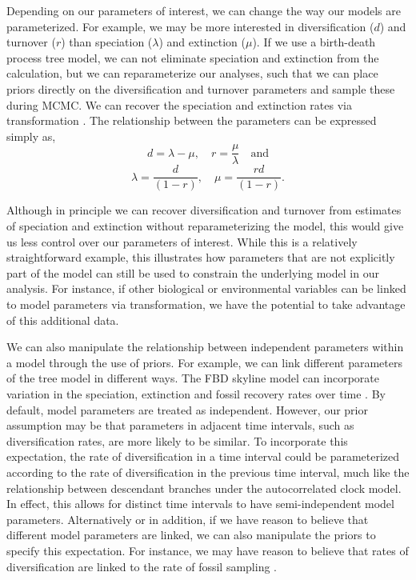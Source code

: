 Depending on our parameters of interest, we can change the way our models are parameterized.
For example, we may be more interested in diversification ($d$) and turnover ($r$) than speciation ($\lambda$) and extinction ($\mu$).
If we use a birth-death process tree model, we can not eliminate speciation and extinction from the calculation, but we can reparameterize our analyses, such that we can place priors directly on the diversification and turnover parameters and sample these during MCMC. We can recover the speciation and extinction rates via transformation \citep{Heath2014}.
The relationship between the parameters can be expressed simply as, 
$$d = \lambda - \mu, \quad r = \frac{\mu}{\lambda} \quad \textrm{and} $$ 
$$\lambda = \frac{d}{(1-r)}, \quad \mu = \frac{rd}{(1 - r)}.$$

Although in principle we can recover diversification and turnover from estimates of speciation and extinction without reparameterizing the model, this would give us less control over our parameters of interest. 
While this is a relatively straightforward example, this illustrates how parameters that are not explicitly part of the model can still be used to constrain the underlying model in our analysis. 
For instance, if other biological or environmental variables %
can be linked to model parameters via transformation, we have the potential to take advantage of this additional data.

We can also manipulate the relationship between independent parameters within a model through the use of priors.
For example, we can link different parameters of the tree model in different ways.
The FBD skyline model can incorporate variation in the speciation, extinction and fossil recovery rates over time \citep{Gavryushkina2014,Zhang2016}.
By default, model parameters are treated as independent.
However, our prior assumption may be that parameters in adjacent time intervals, such as diversification rates, are more likely to be similar.
To incorporate this expectation, the rate of diversification in a time interval could be parameterized according to the rate of diversification in the previous time interval, much like the relationship between descendant branches under the autocorrelated  clock model. 
In effect, this allows for distinct time intervals to have semi-independent model parameters.
Alternatively or in addition, if we have reason to believe that different model parameters are linked, we can also manipulate the priors to specify this expectation.
For instance, we may have reason to believe that rates of diversification are linked to the rate of fossil sampling \citep{Holland1995,Peters2005}.

